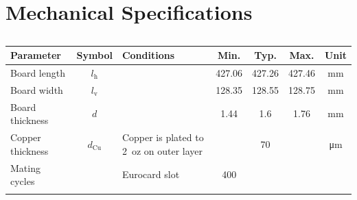\documentclass[10pt]{datasheet}
\begin{document}
\clearpage
\section{Mechanical Specifications}
\begin{table}[h]
    \caption{}
    \begin{tabularx}{\textwidth}{l | c | X | c c c | c}
        \thickhline
        \textbf{Parameter} & \textbf{Symbol} & \textbf{Conditions} & \textbf{Min.} & \textbf{Typ.} & \textbf{Max.} &
        \textbf{Unit} \\
        \hline
        Board length  & $l_\text{h}$ & & 427.06 & 427.26 & 427.46 & \unit{\mm} \\
        Board width  & $l_\text{v}$ & & 128.35 & 128.55 & 128.75 & \unit{\mm} \\
        Board thickness  & $d$ & & 1.44 & 1.6 & 1.76 & \unit{\mm} \\
        \hline
        Copper thickness & $d_\text{Cu}$ & Copper is plated to \qty{2}{oz} on outer layer & & 70 & & \unit{\um} \\
        \hline
        Mating cycles & & Eurocard slot & 400 & & & \\
        \thickhline
    \end{tabularx}
\end{table}
\end{document}
